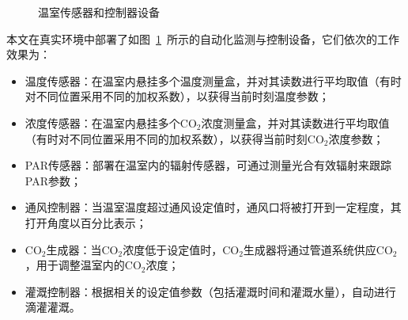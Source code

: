 \begin{figure}[t]
{    }
    \caption{温室传感器和控制器设备}
    \label{fig:devices}
\end{figure}

本文在真实环境中部署了如图~\ref{fig:devices}~所示的自动化监测与控制设备，它们依次的工作效果为：

\begin{itemize}
    \item 温度传感器：在温室内悬挂多个温度测量盒，并对其读数进行平均取值（有时对不同位置采用不同的加权系数），以获得当前时刻温度参数；
    \item 浓度传感器：在温室内悬挂多个CO$_2$浓度测量盒，并对其读数进行平均取值（有时对不同位置采用不同的加权系数），以获得当前时刻CO$_2$浓度参数；
    \item PAR传感器：部署在温室内的辐射传感器，可通过测量光合有效辐射来跟踪PAR参数；
    \item 通风控制器：当温室温度超过通风设定值时，通风口将被打开到一定程度，其打开角度以百分比表示；
    \item CO$_2$生成器：当CO$_2$浓度低于设定值时，CO$_2$生成器将通过管道系统供应CO$_2$，用于调整温室内的CO$_2$浓度；
    \item 灌溉控制器：根据相关的设定值参数（包括灌溉时间和灌溉水量），自动进行滴灌灌溉。
\end{itemize}



